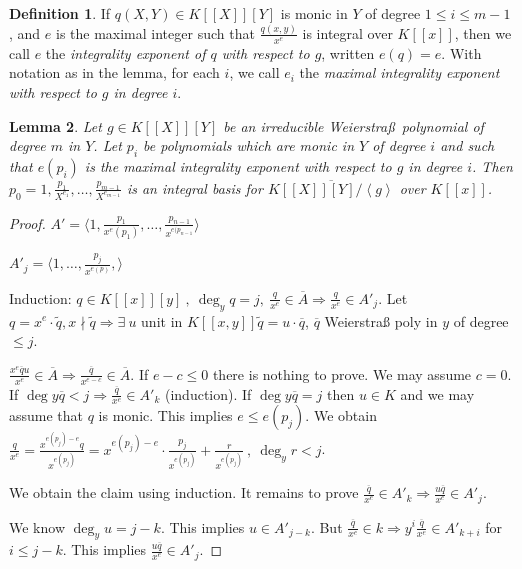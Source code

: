 \documentclass[a4paper,11pt]{amsart}%
\theoremstyle{definition}
\newtheorem{defn}{Definition}[section]
\theoremstyle{plain}
\newtheorem{lemma}[defn]{Lemma}
\theoremstyle{remark}
\begin{document}
\begin{defn}
\label{defn integrality exponent}
If $q(X,Y)\in K[[X]][Y]$ is monic in $Y$ of degree $1\leq i\leq m-1$,
and $e$ is the maximal integer such that $\frac{q(x,y)}{x^e}$ is
integral over $K[[x]]$, then we call $e$ the \emph{integrality exponent
of $q$ with respect to $g$}, written $e(q)=e$. With notation as in the lemma, 
for each $i$, we call $e_i$ the \emph{maximal integrality exponent with respect to $g$
in degree $i$}. 
\end{defn}

\begin{lemma}
\label{lemma loc int bas shape}
Let $g\in K[[X]][Y]$ be an irreducible Weierstra\ss \ polynomial of 
degree $m$ in $Y$. Let $p_i$ be polynomials which are monic in
$Y$ of degree $i$ and such that $e(p_i)$ is the maximal integrality 
exponent with respect to $g$ in degree $i$. Then $p_{0}=1,\frac{p_{1}}{X^{e_{1}}},\ldots
,\frac{p_{m-1}}{X^{e_{m-1}}}$ is an integral basis for $\overline
{K[[X]][Y]/\left\langle g\right\rangle }$ over $K[[x]]$.
\end{lemma}

\begin{proof}
$A' = \langle 1, \frac{p_1}{x^e(p_1)}, \ldots, \frac{p_{n-1}}{x^{e(p_{n-1}}}\rangle$

$A'_j= \langle 1, \ldots, \frac{p_j}{x^{e(p)}},\rangle$

Induction: $q\in K[[x]][y]\ ,\ \deg_y q=j ,\ \frac{q}{x^e}\in\overline{A} \Rightarrow\frac{q}{x^e}\in A'_j$. Let $q=x^e\cdot \widetilde{q}, x\nmid\widetilde{q}\Rightarrow \exists\ u$ unit in $K[[x,y]] \widetilde{q}=u\cdot \overline{q}$, $\overline{q}$ Weierstra{\ss} poly in $y$ of degree $\leq j$.

$\frac{x^e\overline{q}u}{x^e}\in\overline{A}\Rightarrow \frac{\overline{q}}{x^{e-c}}\in\overline{A}$. If $e-c\leq 0$ there is nothing to prove. We may assume $c=0$. If $\deg y\overline{q}<j\Rightarrow \frac{\overline{q}}{x^e}\in A'_k$ (induction). If $\deg y\overline{q}=j$ then $u\in K$ and we may assume that $q$ is monic. This implies $e\leq e(p_j)$. We obtain $\frac{q}{x^e}=\frac{x^{e(p_j)-e}q}{x^{e(p_j)}}= x^{e(p_j)-e}\cdot \frac{p_j}{x^{e(p_j)}}+\frac{r}{x^{e(p_j)}}\ ,\ \deg_y r<j$.

We obtain the claim using induction. It remains to prove $\frac{\overline{q}}{x^e}\in A'_k\Rightarrow \frac{u\overline{q}}{x^e}\in A'_j $. 

We know $\deg_y u=j-k$. This implies $u\in A'_{j-k}$. But $\frac{\overline{q}}{x^e}\in k\Rightarrow y^i\frac{\overline{q}}{x^e}\in A'_{k+i}$ for $i\leq j-k$. This implies $\frac{u\overline{q}}{x^e}\in A'_j$.

\end{proof}
\end{document}
